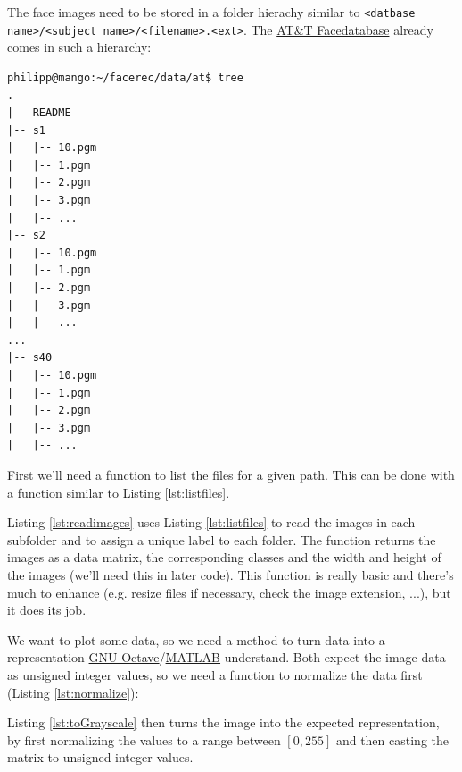 The face images need to be stored in a folder hierachy similar to \lstinline|<datbase name>/<subject name>/<filename>.<ext>|. The \href{http://www.cl.cam.ac.uk/research/dtg/attarchive/facedatabase.html}{AT\&T Facedatabase} already comes in such a hierarchy:

\begin{lstlisting}
philipp@mango:~/facerec/data/at$ tree
.
|-- README
|-- s1
|   |-- 10.pgm
|   |-- 1.pgm
|   |-- 2.pgm
|   |-- 3.pgm
|   |-- ...
|-- s2
|   |-- 10.pgm
|   |-- 1.pgm
|   |-- 2.pgm
|   |-- 3.pgm
|   |-- ...
...
|-- s40
|   |-- 10.pgm
|   |-- 1.pgm
|   |-- 2.pgm
|   |-- 3.pgm
|   |-- ...
\end{lstlisting}

First we'll need a function to list the files for a given path. This can be done with a function similar to Listing \ref{lst:listfiles}.



Listing \ref{lst:readimages} uses Listing \ref{lst:listfiles} to read the images in each subfolder and to assign a unique label to each folder. The function returns the images as a data matrix, the corresponding classes and the width and height of the images (we'll need this in later code). This function is really basic and there's much to enhance (e.g. resize files if necessary, check the image extension, ...), but it does its job.



We want to plot some data, so we need a method to turn data into a representation  \href{http://www.gnu.org/software/octave/}{GNU Octave}/\href{http://www.mathworks.com}{MATLAB} understand. Both expect the image data as unsigned integer values, so we need a function to normalize the data first (Listing \ref{lst:normalize}):



Listing \ref{lst:toGrayscale} then turns the image into the expected representation, by first normalizing the values to a range between $[0,255]$ and then casting the matrix to unsigned integer values.




